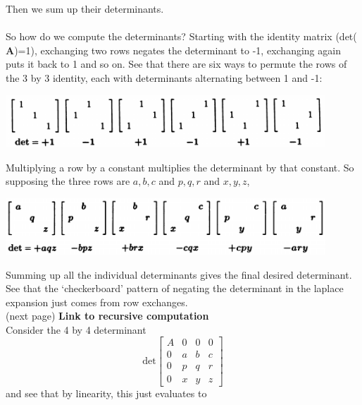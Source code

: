 \documentclass{report}
\begin{document}
Then we sum up their determinants.\\
\vspace{1mm}\\
So how do we compute the determinants?
Starting with the identity matrix (det($\bm A$)=1), exchanging two rows negates the determinant to -1, exchanging again puts it back to 1 
and so on. See that there are six ways to permute the rows of the 3 by 3 identity, each with determinants alternating between 1 and -1:
\begin{center}
\includegraphics[width=12cm]{97}
\end{center}
Multiplying a row by a constant multiplies the determinant by that constant. So supposing the three rows are $a,b,c$ and $p,q,r$ and $x,y,z$, 
\begin{center}
\includegraphics[width=12cm]{99}
\end{center}
Summing up all the individual determinants gives the final desired determinant. See that the `checkerboard' pattern of negating the determinant in the laplace expansion
just comes from row exchanges.\\
(next page)\newpage
\noindent\textbf{Link to recursive computation}\\
Consider the 4 by 4 determinant 
\begin{equation*}
\text{det}\left[\begin{array}{cccc}
A&0&0&0\\
0&a&b&c\\
0&p&q&r\\
0&x&y&z
\end{array}\right]
\end{equation*}
and see that by linearity, this just evaluates to
\end{document}

